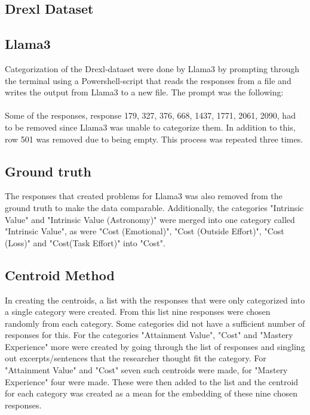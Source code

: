 \begin{flushleft}
\section{Drexl Dataset}
\subsection{Llama3}
Categorization of the Drexl-dataset were done by Llama3 by prompting through the terminal using a Powershell-script that reads the responses from a file
and writes the output from Llama3 to a new file. The prompt was the following:\\
\\[5pt]

Some of the responses, response 179, 327, 376, 668, 1437, 1771, 2061, 2090, had to be removed since Llama3 was unable to categorize them. In addition to this, row 501 was removed due to being empty. 
This process was repeated three times. 

\subsection{Ground truth}
The responses that created problems for Llama3 was also removed from the ground truth to make the data comparable. Additionally, the categories "Intrinsic Value" and "Intrinsic Value (Astronomy)" were merged into one category
called "Intrinsic Value", as were "Cost (Emotional)", "Cost (Outside Effort)", "Cost (Loss)" and "Cost(Task Effort)"  into "Cost". 

\subsection{Centroid Method}
In creating the centroids, a list with the responses that were only categorized into a single category were created. From this list nine responses were chosen randomly from each category. Some categories did not have a sufficient number of responses for this.
For the categories "Attainment Value", "Cost" and "Mastery Experience" more were created by going through the list of responses and singling out excerpts/sentences that the researcher thought fit the category. For "Attainment Value" and "Cost" seven such centroids were made,
for "Mastery Experience" four were made. These were then added to the list and the centroid for each category was created as a mean for the embedding of these nine chosen responses.

\end{flushleft}